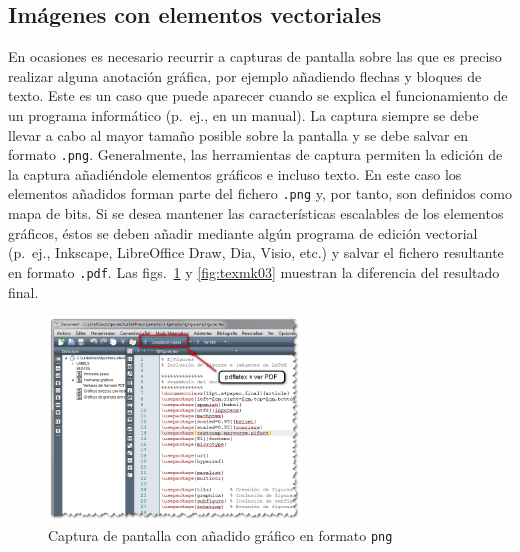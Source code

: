 \documentclass[11pt,a4paper]{article}
\begin{document}
\subsection{Imágenes con elementos vectoriales}
En ocasiones es necesario recurrir a capturas de pantalla sobre las que es preciso realizar alguna anotación gráfica, por ejemplo añadiendo flechas y bloques de texto. Este es un caso que puede aparecer cuando se explica el funcionamiento de un programa informático (p.~ej., en un manual). La captura siempre se debe llevar a cabo al mayor tamaño posible sobre la pantalla y se debe salvar en formato \texttt{.png}. Generalmente, las herramientas de captura permiten la edición de la captura añadiéndole elementos gráficos e incluso texto. En este caso los elementos añadidos 
forman parte del fichero \texttt{.png} y, por tanto, son definidos como mapa de bits. Si se desea mantener las características escalables de los elementos gráficos, éstos se deben añadir mediante algún programa de edición vectorial (p.~ej.,  
\textsf{Inkscape}, \textsf{LibreOffice Draw}, \textsf{Dia}, \textsf{Visio}, etc.) y salvar el fichero resultante en formato \texttt{.pdf}. Las figs.~\ref{fig:texmk02} y \ref{fig:texmk03} muestran la diferencia del resultado final.

\begin{figure}[H]
	\centering
	\includegraphics[width=0.6\textwidth]{../figs/texmk02} 
	\caption[Captura con gráfico en \texttt{png}]{Captura de pantalla con añadido gráfico en formato \texttt{png}}
	\label{fig:texmk02}
\end{figure}
\end{document}
